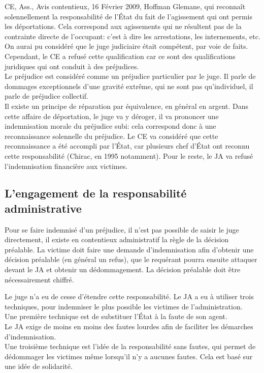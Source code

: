 \documentclass[10pt, a4paper, openany]{book}
\begin{document}
CE, Ass., Avis contentieux, 16 Février 2009, Hoffman Glemane, qui reconnaît solennellement la responsabilité de l'État du fait de l'agissement qui ont permis les déportations. Cela correspond aux agissements qui ne résultent pas de la contrainte directe de l'occupant: c'est à dire les arrestations, les internements, etc. \\
On aurai pu considéré que le juge judiciaire était compétent, par voie de faits. Cependant, le CE a refusé cette qualification car ce sont des qualifications juridiques qui ont conduit à des préjudices. \\
Le préjudice est considéré comme un préjudice particulier par le juge. Il parle de dommages exceptionnels d'une gravité extrême, qui ne sont pas qu'individuel, il parle de préjudice collectif. \\
Il existe un principe de réparation par équivalence, en général en argent. Dans cette affaire de déportation, le juge va y déroger, il va prononcer une indemnisation morale du préjudice subi: cela correspond donc à une reconnaissance solennelle du préjudice. Le CE va considéré que cette reconnaissance a été accompli par l'État, car plusieurs chef d'État ont reconnu cette responsabilité (Chirac, en 1995 notamment). Pour le reste, le JA va refusé l'indemnisation financière aux victimes. 

\subsection{L'engagement de la responsabilité administrative}

Pour se faire indemnisé d'un préjudice, il n'est pas possible de saisir le juge directement, il existe en contentieux administratif la règle de la décision préalable. La victime doit faire une demande d'indemnisation afin d'obtenir une décision préalable (en général un refus), que le requérant pourra ensuite attaquer devant le JA et obtenir un dédommagement. La décision préalable doit être nécessairement chiffré.


Le juge n'a eu de cesse d'étendre cette responsabilité. Le JA a eu à utiliser trois techniques, pour indemniser le plus possible les victimes de l'administration. \\
Une première technique est de substituer l'État à la faute de son agent. \\
Le JA exige de moins en moins des fautes lourdes afin de faciliter les démarches d'indemnisation. \\
Une troisième technique est l'idée de la responsabilité sans fautes, qui permet de dédommager les victimes même lorsqu'il n'y a aucunes fautes. Cela est basé sur une idée de solidarité.
\end{document}
